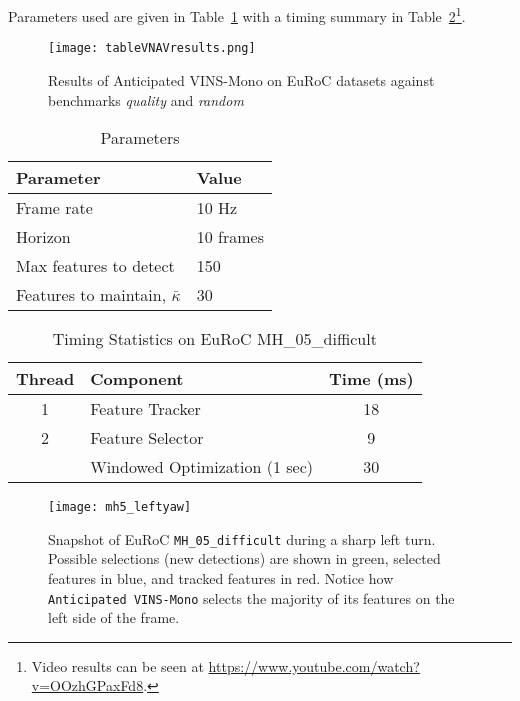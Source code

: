 Parameters used are given in Table~\ref{tab:parameters} with a timing summary in Table~\ref{tab:timing}\footnote{Video results can be seen at \url{https://www.youtube.com/watch?v=OOzhGPaxFd8}.}.

\begin{figure}
	\centering
	\texttt{[image: tableVNAVresults.png]} 
	\caption{Results of Anticipated VINS-Mono on EuRoC datasets against benchmarks \textit{quality} and \textit{random}}
	\label{tab:results} 
\end{figure}


\begin{table}[h]
\centering
\caption{Parameters}
\begin{tabular}{ll}
    \toprule
    Parameter & Value \\
    \midrule
    Frame rate & 10 Hz \\
    Horizon & 10 frames \\
    Max features to detect & 150 \\
    Features to maintain, $\bar{\kappa}$ & 30 \\
    \bottomrule
\end{tabular}
\label{tab:parameters}
\end{table}

\begin{table}[h]
\centering
\caption{Timing Statistics on EuRoC MH\_05\_difficult}
\begin{tabular}{clc}
    \toprule
    Thread & Component & Time (ms) \\
    \midrule
    1 & Feature Tracker & 18 \\
    \midrule
    2 & Feature Selector & 9 \\
      & Windowed Optimization (1 sec) & 30 \\
    \bottomrule
\end{tabular}
\label{tab:timing}
\end{table}

\begin{figure}
\centering
\texttt{[image: mh5\_leftyaw]} 
\caption{Snapshot of EuRoC \texttt{MH\_05\_difficult} during a sharp left turn. Possible selections (new detections) are shown in green, selected features in blue, and tracked features in red. Notice how \texttt{Anticipated VINS-Mono} selects the majority of its features on the left side of the frame.}
\label{fig:architecture} 
\end{figure}